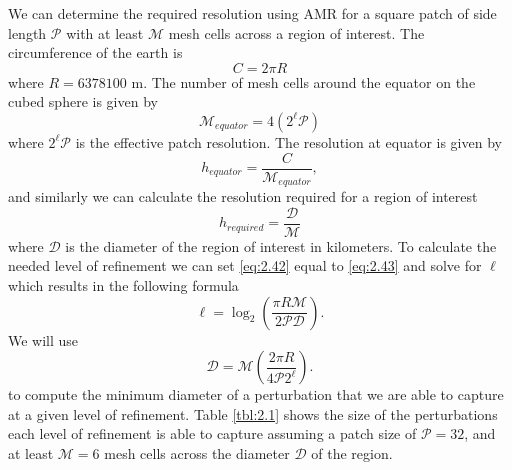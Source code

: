 \documentclass[twoside]{bsu-ms}
\begin{document}
We can determine the required resolution using AMR for a square patch of side length $\mathcal{P}$ with at least $\mathcal{M}$ mesh cells across a region of interest. The circumference of the earth is 
\begin{equation}\label{eq:2.40}
    C=2\pi R
\end{equation}
where $R=6378100$ $\mathrm{m}$. The number of mesh cells around the equator on the cubed sphere is given by
\begin{equation}\label{eq:2.41}
    \mathcal{M}_{equator}=4\left(2^{\ell}\mathcal{P}\right)
\end{equation}
where $2^{\ell}\mathcal{P}$ is the effective patch resolution. The resolution at equator is given by
\begin{equation}\label{eq:2.42}
    h_{equator}=\frac{C}{\mathcal{M}_{equator}},
\end{equation}
and similarly we can calculate the resolution required for a region of interest
\begin{equation}\label{eq:2.43}
    h_{required}=\frac{\mathcal{D}}{\mathcal{M}}
\end{equation}
where $\mathcal{D}$ is the diameter of the region of interest in kilometers.
To calculate the needed level of refinement we can set \eqref{eq:2.42} equal to \eqref{eq:2.43} and solve for $\ell$ which results in the following formula
\begin{equation}\label{eq:2.44}
	\ell=\log_{2}\left(\frac{\pi R \mathcal{M}}{2\mathcal{P}\mathcal{D}}\right).
\end{equation}
 We will use
\begin{equation}\label{eq:2.45}
	\mathcal{D}=\mathcal{M}\left(\frac{2\pi R}{4\mathcal{P}2^{\ell}}\right).
\end{equation} 
to compute the minimum diameter of a perturbation that we are able to capture at a given level of refinement. Table \ref{tbl:2.1} shows the size of the perturbations each level of refinement is able to capture assuming a patch size of $\mathcal{P}=32$, and at least $\mathcal{M}=6$ mesh cells across the diameter $\mathcal{D}$ of the region. 
\end{document}
